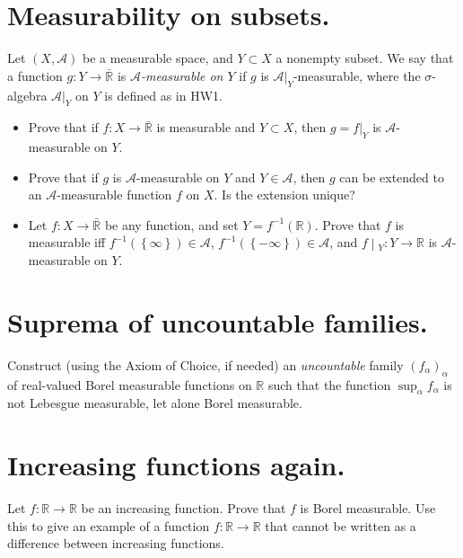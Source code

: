 \section{Measurability on subsets.}

Let \((X,\mathcal{A})\) be a measurable space, and \(Y \subset X\) a nonempty subset. We say that a function \(g:Y\rightarrow\bar{\mathbb{R}}\) is \emph{\(\mathcal{A}\)-measurable on \(Y\)} if \(g\) is \(\mathcal{A}|_{Y}\)-measurable, where the \(\sigma\)-algebra \(\mathcal{A}|_{Y}\) on \(Y\) is defined as in HW1.

\begin{itemize}
\item
  Prove that if \(f:X\rightarrow\bar{\mathbb{R}}\) is measurable and \(Y \subset X\), then \(g = f|_{Y}\) is \(\mathcal{A}\)-measurable on \(Y\).
\item
  Prove that if \(g\) is \(\mathcal{A}\)-measurable on \(Y\) and \(Y \in \mathcal{A}\), then \(g\) can be extended to an \(\mathcal{A}\)-measurable function \(f\) on \(X\). Is the extension unique?
\item
  Let \(f:X\rightarrow\bar{\mathbb{R}}\) be any function, and set \(Y = f^{- 1}(\mathbb{R})\). Prove that \(f\) is measurable iff \(f^{- 1}(\left\{ \infty \right\}) \in \mathcal{A}\), \(f^{- 1}(\left\{ {- \infty} \right\}) \in \mathcal{A}\), and \(\left. f \middle| {}_{Y}:Y\rightarrow\mathbb{R} \right.\) is \(\mathcal{A}\)-measurable on \(Y\).
\end{itemize}

\section{Suprema of uncountable families.}

Construct (using the Axiom of Choice, if needed) an \emph{uncountable} family \((f_{\alpha})_{\alpha}\) of real-valued Borel measurable functions on \(\mathbb{R}\) such that the function \(\sup_{\alpha}f_{\alpha}\) is not Lebesgue measurable, let alone Borel measurable.

\section{Increasing functions again.}

Let \(f:\mathbb{R}\rightarrow\mathbb{R}\) be an increasing function. Prove that \(f\) is Borel measurable. Use this to give an example of a function \(f:\mathbb{R}\rightarrow\mathbb{R}\) that cannot be written as a difference between increasing functions.

